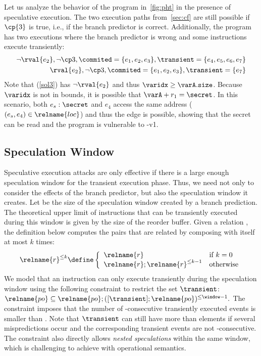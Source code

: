 \documentclass[conference]{IEEEtran}
\begin{document}
Let us analyze the behavior of the program in~\autoref{fig:pht} in the presence of speculative execution.
The two execution paths from~\autoref{sec:cf} are still possible if $\cp{3}$ is true, i.e., if the branch predictor is correct.
Additionally, the program has two executions where the branch predictor is wrong and some instructions execute transiently:
\begin{eqnarray}
\label{sol3}
\neg \rval{e_2}, \neg \cp 3, \commited = \{ e_1, e_2, e_3 \}, \transient = \{ e_4, e_5, e_6, e_7 \} \\
\rval{e_2}, \neg \cp 3, \commited = \{ e_1, e_2, e_3 \}, \transient = \{ e_7 \} \nonumber
\end{eqnarray}
Note that (\ref{sol3}) has $\neg \rval{e_2}$ and thus $\varidx \geq \varA.\texttt{size}$.
Because $\varidx$ is not in bounds, it is possible that $\varA + r_1 = \secret$.
In this scenario, both $e_s: \secret$ and $e_4$ access the same address ($(e_s,e_4) \in \relname{loc}$) and thus the  edge is possible, showing that the secret can be read and the program is vulnerable to \spectre-v1.

\subsection{Speculation Window}
\label{sec:win}

Speculative execution attacks are only effective if there is a large enough speculation window for the transient execution phase.
Thus, we need not only to consider the effects of the branch predictor, but also the speculation window it creates.
Let \window be the size of the speculation window created by a branch prediction.
The theoretical upper limit of instructions that can be transiently executed during this window is given by the size of the reorder buffer.
Given a relation , the definition below computes the pairs that are related by composing  with itself at most $k$ times:
$$\relname{r}^{\leq k} \define
\left\{
	\begin{array}{ll}
		\relname{r} & \mbox{if } k = 0 \\
		\relname{r};\relname{r}^{\leq k-1} & \mbox{otherwise}
	\end{array}
\right.
$$
We model that an instruction can only execute transiently during the speculation window using the following constraint to restrict the set $\transient$:
$\relname{po} \subseteq \relname{po} ; ([\transient] ; \relname{po})^{\leq \window-1}.$
The constraint imposes that the number of -consecutive transiently executed events is smaller than \window.
Note that $\transient$ can still have more than \window elements if several mispredictions occur and the corresponding transient events are not -consecutive.
The constraint also directly allows \emph{nested speculations} within the same window, which is challenging to achieve with operational semantics.
\end{document}
